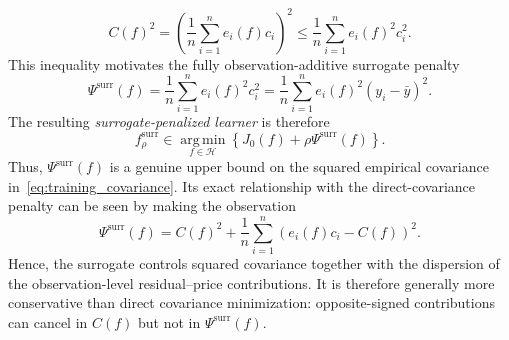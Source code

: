 \documentclass[10pt]{article}
\theoremstyle{definition}
\newcommand{\1}{\mathbf{1}}
\newcommand{\Hcal}{\mathcal{H}}
\newcommand{\argminop}{\operatorname*{arg\,min}}
\begin{document}
{
\begin{equation}
\label{eq:surrogate_upper_bound}
C(f)^2
=
\left(
\frac{1}{n}\sum_{i=1}^n e_i(f)c_i
\right)^2
\leq
\frac{1}{n}\sum_{i=1}^n e_i(f)^2c_i^2.
\end{equation}
}
{This inequality motivates the fully observation-additive surrogate penalty}
\begin{equation}
\label{eq:surrogate}
\Psi^{\mathrm{surr}}(f)
=
\frac{1}{n}\sum_{i=1}^n e_i(f)^2c_i^2
=
\frac{1}{n}\sum_{i=1}^n
e_i(f)^2(y_i-\bar y)^2.
\end{equation}
The resulting \emph{surrogate-penalized learner} is therefore
\begin{equation}
\label{eq:surrogate_learning}
f_\rho^{\mathrm{surr}}
\in
\argminop_{f\in\Hcal}
\left\{
{J_0(f)}
+
\rho\Psi^{\mathrm{surr}}(f)
\right\}.
\end{equation}
{
Thus, $\Psi^{\mathrm{surr}}(f)$ is a genuine upper bound on the squared empirical covariance in~\eqref{eq:training_covariance}. Its exact relationship with the direct-covariance penalty can be seen by making the observation
\begin{equation}
\label{eq:surrogate_decomposition}
\Psi^{\mathrm{surr}}(f)
=
C(f)^2
+
\frac{1}{n}
\sum_{i=1}^n
\left(e_i(f)c_i-C(f)\right)^2.
\end{equation}
Hence, the surrogate controls squared covariance together with the dispersion of the observation-level residual--price contributions. It is therefore generally more conservative than direct covariance minimization: opposite-signed contributions can cancel in $C(f)$ but not in $\Psi^{\mathrm{surr}}(f)$.
}
\end{document}

